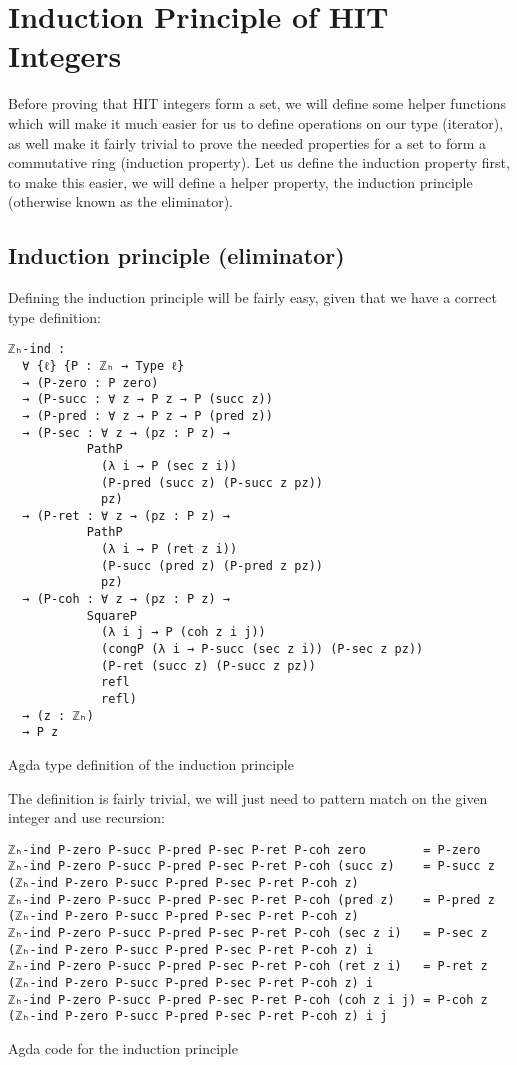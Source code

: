 \chapter{Induction Principle of HIT Integers}
\label{ch:indprin}

Before proving that HIT integers form a set, we will define some helper functions which will make it much easier for us to define operations on our type (iterator), as well make it fairly trivial to prove the needed properties for a set to form a commutative ring (induction property). Let us define the induction property first, to make this easier, we will define a helper property, the induction principle (otherwise known as the eliminator).

\section{Induction principle (eliminator)}

Defining the induction principle will be fairly easy, given that we have a correct type definition:
\begin{listing}[H]
\begin{verbatim}
ℤₕ-ind :
  ∀ {ℓ} {P : ℤₕ → Type ℓ}
  → (P-zero : P zero)
  → (P-succ : ∀ z → P z → P (succ z))
  → (P-pred : ∀ z → P z → P (pred z))
  → (P-sec : ∀ z → (pz : P z) →
           PathP
             (λ i → P (sec z i))
             (P-pred (succ z) (P-succ z pz))
             pz)
  → (P-ret : ∀ z → (pz : P z) →
           PathP
             (λ i → P (ret z i))
             (P-succ (pred z) (P-pred z pz))
             pz)
  → (P-coh : ∀ z → (pz : P z) →
           SquareP
             (λ i j → P (coh z i j))
             (congP (λ i → P-succ (sec z i)) (P-sec z pz))
             (P-ret (succ z) (P-succ z pz))
             refl
             refl)
  → (z : ℤₕ)
  → P z
\end{verbatim}
\caption{Agda type definition of the induction principle}
\end{listing}

The definition is fairly trivial, we will just need to pattern match on the given integer and use recursion:
\begin{listing}[H]
\begin{verbatim}
ℤₕ-ind P-zero P-succ P-pred P-sec P-ret P-coh zero        = P-zero
ℤₕ-ind P-zero P-succ P-pred P-sec P-ret P-coh (succ z)    = P-succ z (ℤₕ-ind P-zero P-succ P-pred P-sec P-ret P-coh z)
ℤₕ-ind P-zero P-succ P-pred P-sec P-ret P-coh (pred z)    = P-pred z (ℤₕ-ind P-zero P-succ P-pred P-sec P-ret P-coh z)
ℤₕ-ind P-zero P-succ P-pred P-sec P-ret P-coh (sec z i)   = P-sec z (ℤₕ-ind P-zero P-succ P-pred P-sec P-ret P-coh z) i
ℤₕ-ind P-zero P-succ P-pred P-sec P-ret P-coh (ret z i)   = P-ret z (ℤₕ-ind P-zero P-succ P-pred P-sec P-ret P-coh z) i
ℤₕ-ind P-zero P-succ P-pred P-sec P-ret P-coh (coh z i j) = P-coh z (ℤₕ-ind P-zero P-succ P-pred P-sec P-ret P-coh z) i j
\end{verbatim}
\caption{Agda code for the induction principle}
\end{listing}

